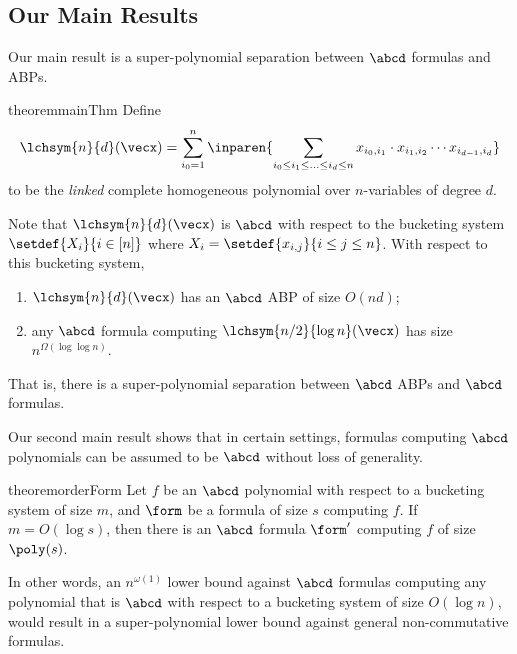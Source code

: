 \subsection{Our Main Results}

Our main result is a super-polynomial separation between $\abcd$ formulas and ABPs.

\begin{restatable}{theorem}{mainThm}\label{thm:main}
	Define 
	\[
		\lchsym{n}{d}(\vecx) = \sum_{i_0=1}^{n} \inparen{\sum_{i_0 \leq i_1 \leq \ldots \leq i_d \leq n} x_{i_0, i_1} \cdot x_{i_1,i_2} \cdots x_{i_{d-1}, i_d}}
	\]
	to be the \emph{linked} complete homogeneous polynomial over $n$-variables of degree $d$.

	Note that $\lchsym{n}{d}(\vecx)$ is $\abcd$ with respect to the bucketing system $\setdef{X_i}{i \in [n]}$ where $X_i = \setdef{x_{i,j}}{i \leq j \leq n}$. With respect to this bucketing system,  
	\begin{enumerate}
		\item $\lchsym{n}{d}(\vecx)$ has an $\abcd$ ABP of size $O(nd)$;
		
		\item any $\abcd$ formula computing $\lchsym{n/2}{\log n}(\vecx)$ has size $n^{\Omega(\log \log n)}$.
	\end{enumerate}
	That is, there is a super-polynomial separation between $\abcd$ ABPs and $\abcd$ formulas.
\end{restatable}

Our second main result shows that in certain settings, formulas computing $\abcd$ polynomials can be assumed to be $\abcd$ without loss of generality.

\begin{restatable}{theorem}{orderForm}\label{thm:orderForm}
	Let $f$ be an $\abcd$ polynomial with respect to a bucketing system of size $m$, and $\form$ be a formula of size $s$ computing $f$.
	If $m = O(\log s)$, then there is an $\abcd$ formula  $\form'$ computing $f$ of size $\poly(s)$.
\end{restatable}

\noindent In other words, an $n^{\omega(1)}$ lower bound against $\abcd$ formulas computing any polynomial that is $\abcd$ with respect to a bucketing system of size $O(\log n)$, would result in a super-polynomial lower bound against general non-commutative formulas.\\

